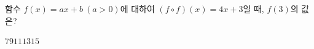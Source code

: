 함수 $f(x)=ax+b\ (a>0)$에 대하여 $(f\circ f)(x)=4x+3$일 때, $f(3)$의 값은? 
\begin{choices32}{$7$}{$9$}{$11$}{$13$}{$15$}\end{choices32}
